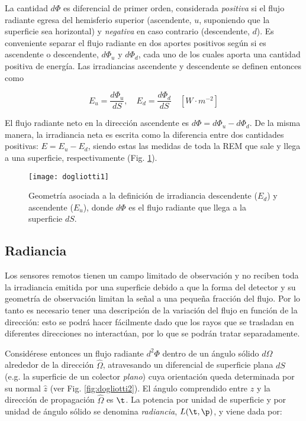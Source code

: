 La cantidad $d\Phi$ es diferencial de primer orden,
considerada \textit{positiva} si el flujo radiante egresa del hemisferio superior
(ascendente, $u$, suponiendo que la superficie sea horizontal)
y \textit{negativa} en caso contrario (descendente, $d$).
Es conveniente separar el flujo radiante en dos aportes positivos
según si es ascendente o descendente, $d\Phi_{u}$ y $d\Phi_{d}$,
cada uno de los cuales aporta una cantidad positiva de energía.
Las irradiancias ascendente y descendente se definen entonces como

\begin{equation}
 E_{u}=\frac{d\Phi_{u}}{dS}, \quad
 E_{d}=\frac{d\Phi_{d}}{dS}\quad [W\cdot m^{-2}]
\label{irrad_ascen_descen}
\end{equation}

El flujo radiante neto en la dirección ascendente es $d\Phi=d\Phi_{u}-d\Phi_{d}$.
De la misma manera, la irradiancia neta es escrita como la diferencia entre dos cantidades positivas:
$E=E_{u}-E_{d}$, siendo estas las medidas de toda la REM que sale y llega a una
superficie, respectivamente (Fig. \ref{fig:dogliotti1}).

\begin{figure}
\centering
\texttt{[image: dogliotti1]}
\caption[Irradiancias ascendente y descendente]{Geometría asociada a la definición de irradiancia descendente ($E_{d}$) y ascendente ($E_{u}$),
donde $d\Phi$ es el flujo radiante que llega a la superficie $dS$.} 
\label{fig:dogliotti1}
\end{figure}

\subsection{Radiancia}
Los sensores remotos tienen un campo limitado de observación y no reciben toda
la irradiancia emitida por una superficie debido a que la forma del detector y su
geometría de observación limitan la señal a una pequeña fracción del flujo. Por lo
tanto es necesario tener una descripción de la variación del flujo en función de la
dirección: esto se podrá hacer fácilmente dado que los rayos que se trasladan en 
diferentes direcciones no interactúan, por lo que se podrán tratar separadamente.

Considérese entonces un flujo radiante $d^{2}\Phi$ dentro de un ángulo sólido
$d\Omega$ alrededor de la dirección $\hat{\Omega}$, atravesando un diferencial
de superficie plana $dS$ (e.g. la superficie de un colector \textit{plano})
cuya orientación queda determinada por su normal $\hat{z}$ (ver Fig. \ref{fig:dogliotti2}).
El ángulo comprendido entre $\hat{z}$ y la dirección de propagación $\hat{\Omega}$ es $\t$. 
La potencia por unidad de superficie y por unidad de ángulo sólido se denomina \textit{radiancia}, $L(\t,\p)$,
y viene dada por:

